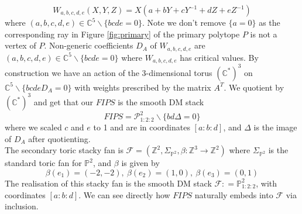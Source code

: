 \documentclass[oneside,reqno]{amsart}
\theoremstyle{definition}
\theoremstyle{definition}
\theoremstyle{definition}
\theoremstyle{definition}
\newcommand{\defeq}{\mathrel{\mathop:}=}
\newcommand{\CC}{\mathbb{C}}
\newcommand{\PP}{\mathbb{P}}
\newcommand{\Z}{\mathbb{Z}}
\begin{document}
\begin{equation*}
    W_{a,b,c,d,e}(X,Y,Z) = X\left(a + bY + cY^{-1} + d Z + e Z^{-1}\right)
\end{equation*}
where $(a,b,c,d,e) \in \CC^5 \backslash \{ bcde = 0\}$. Note we don't remove $\{a=0 \}$ as the corresponding ray in Figure \ref{fig:primary} of the primary polytope $P$ is not a vertex of $P$. Non-generic coefficients $D_A$ of $W_{a,b,c,d,e}$ are $(a,b,c,d,e) \in \CC^5 \backslash \{ bcde = 0\}$ where $W_{a,b,c,d,e}$ has critical values. By construction we have an action of the 3-dimensional torus $(\CC^*)^3$ on $\CC^5 \backslash \{ bcdeD_A = 0\}$ with weights prescribed by the matrix $A^T$. We quotient by $(\CC^*)^3$ and get that our $FIPS$ is the smooth DM stack
$$
FIPS = \mathcal{P}^2_{1:2:2}\backslash \{bd\Delta = 0\}
$$
where we scaled $c$ and $e$ to 1 and are in coordinates $[a:b:d]$, and $\Delta$ is the image of $D_A$ after quotienting. \\
\newline
The secondary toric stacky fan is $\mathcal{F} = (\Z^2, \Sigma_{\PP^2},\beta : \Z^3 \to \Z^2)$ where $\Sigma_{\PP^2}$ is the standard toric fan for $\PP^2$, and $\beta$ is given by
$$
\beta(e_1)= (-2,-2), \: \beta(e_2) = (1,0), \: \beta(e_3) = (0,1)
$$
The realisation of this stacky fan is the smooth DM stack $\mathcal{F} \defeq \PP^2_{1:2:2}$, with coordinates $[a:b:d]$. We can see directly how $FIPS$ naturally embeds into $\mathcal{F}$ via inclusion. 
\end{document}
